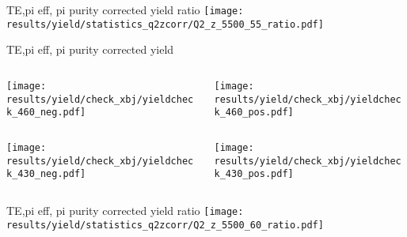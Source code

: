 \begin{frame}{TE,pi eff, pi purity corrected yield ratio}
\texttt{[image: results/yield/statistics\_q2zcorr/Q2\_z\_5500\_55\_ratio.pdf]}
\end{frame}
\begin{frame}{TE,pi eff, pi purity corrected yield}
\begin{columns}
\begin{column}[T]{0.5\textwidth}
\texttt{[image: results/yield/check\_xbj/yieldcheck\_460\_neg.pdf]}
\end{column}
\begin{column}[T]{0.5\textwidth}
\texttt{[image: results/yield/check\_xbj/yieldcheck\_460\_pos.pdf]}
\end{column}
\end{columns}
\begin{columns}
\begin{column}[T]{0.5\textwidth}
\texttt{[image: results/yield/check\_xbj/yieldcheck\_430\_neg.pdf]}
\end{column}
\begin{column}[T]{0.5\textwidth}
\texttt{[image: results/yield/check\_xbj/yieldcheck\_430\_pos.pdf]}
\end{column}
\end{columns}
\end{frame}
\begin{frame}{TE,pi eff, pi purity corrected yield ratio}
\texttt{[image: results/yield/statistics\_q2zcorr/Q2\_z\_5500\_60\_ratio.pdf]}
\end{frame}
